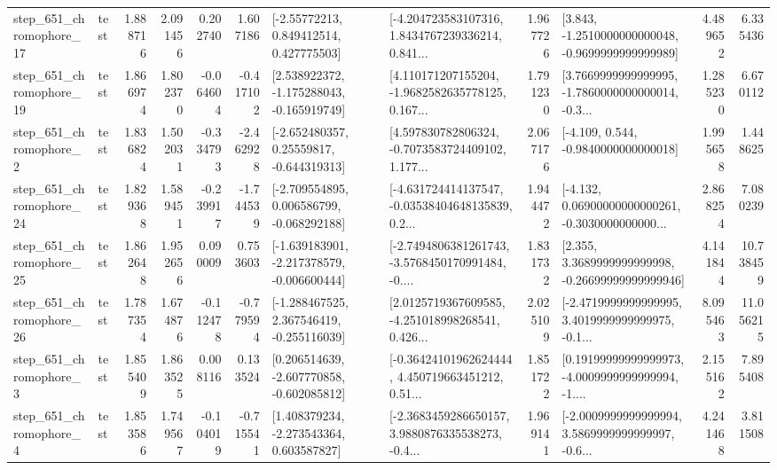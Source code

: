 \begin{tabular}{llrrrrllrlrr}
  step\_651\_chromophore\_17 &      test &      1.888716 &    2.091456 &      0.202740 &  1.607186 &     [-2.55772213, 0.849412514, 0.427775503] &  [-4.204723583107316, 1.8434767239336214, 0.841... &       1.967726 &  [3.843, -1.2510000000000048, -0.9699999999999989] &            4.489652 &          6.335436 \\
  step\_651\_chromophore\_19 &      test &      1.866974 &    1.802370 &     -0.064604 & -0.417102 &   [2.538922372, -1.175288043, -0.165919749] &  [4.110171207155204, -1.9682582635778125, 0.167... &       1.791230 &  [3.7669999999999995, -1.7860000000000014, -0.3... &            1.285230 &          6.670112 \\
   step\_651\_chromophore\_2 &      test &      1.836824 &    1.502031 &     -0.334793 & -2.462928 &    [-2.652480357, 0.25559817, -0.644319313] &  [4.597830782806324, -0.7073583724409102, 1.177... &       2.067176 &               [-4.109, 0.544, -0.9840000000000018] &            1.995658 &          1.448625 \\
  step\_651\_chromophore\_24 &      test &      1.829368 &    1.589451 &     -0.239917 & -1.744539 &   [-2.709554895, 0.006586799, -0.068292188] &  [-4.631724414137547, -0.03538404648135839, 0.2... &       1.944472 &  [-4.132, 0.06900000000000261, -0.3030000000000... &            2.868254 &          7.080239 \\
  step\_651\_chromophore\_25 &      test &      1.862648 &    1.952656 &      0.090009 &  0.753603 &  [-1.639183901, -2.217378579, -0.006600444] &  [-2.7494806381261743, -3.5768450170991484, -0.... &       1.831732 &  [2.355, 3.3689999999999998, -0.26699999999999946] &            4.141844 &         10.738459 \\
  step\_651\_chromophore\_26 &      test &      1.787354 &    1.674876 &     -0.112478 & -0.779594 &   [-1.288467525, 2.367546419, -0.255116039] &  [2.0125719367609585, -4.251018998268541, 0.426... &       2.025109 &  [-2.4719999999999995, 3.4019999999999975, -0.1... &            8.095463 &         11.056215 \\
   step\_651\_chromophore\_3 &      test &      1.855409 &    1.863525 &      0.008116 &  0.133524 &   [0.206514639, -2.607770858, -0.602085812] &  [-0.36424101962624444, 4.450719663451212, 0.51... &       1.851722 &  [0.19199999999999973, -4.0009999999999994, -1.... &            2.155162 &          7.895408 \\
   step\_651\_chromophore\_4 &      test &      1.853586 &    1.749567 &     -0.104019 & -0.715541 &    [1.408379234, -2.273543364, 0.603587827] &  [-2.3683459286650157, 3.9880876335538273, -0.4... &       1.969141 &  [-2.0009999999999994, 3.5869999999999997, -0.6... &            4.241468 &          3.811508 \\

\end{tabular}
